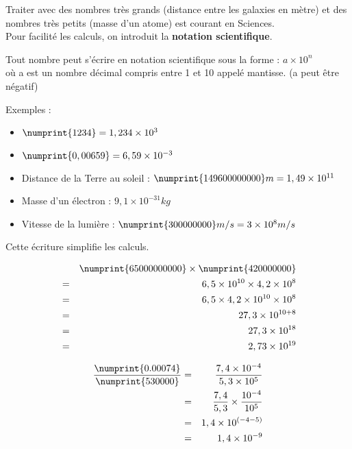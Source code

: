\documentclass[10pt]{article}
\begin{document}
Traiter avec des nombres très grands (distance entre les galaxies en mètre) et des nombres très petits (masse d'un atome) est courant en Sciences. \\
Pour facilité les calculs, on introduit la \textbf{notation scientifique}.

\begin{Definition}
  Tout nombre peut s'écrire en notation scientifique sous la forme : $ \boxed{ a \times 10^n} $\\
  où a est un nombre décimal compris entre 1 et 10 appelé mantisse. (a peut être négatif)
\end{Definition}

\begin{multicols}{3}

  Exemples :
  \begin{itemize}
  \item $\numprint{1 234} = 1,234 \times 10^3$
  \item $\numprint{0,006 59} = 6,59 \times 10^{-3}$
  \item Distance de la Terre au soleil :  $\numprint{149 600 000 000}m = 1,49 \times 10^{11}$
  \item Masse d'un électron : $9,1 \times 10^{-31}kg$
  \item Vitesse de la lumière : $\numprint{300 000 000}m/s = 3 \times 10 ^8 m/s$
  \end{itemize}

  Cette écriture simplifie les calculs.

  \begin{eqnarray*}
    & & \numprint{65 000 000 000} \times \numprint{420 000 000} \\
    &=& 6,5 \times 10 ^{10} \times 4,2 \times 10 ^{8} \\
    &=& 6,5 \times 4,2 \times 10^{10} \times 10^8 \\
    &=& 27,3 \times 10^{10 + 8}\\
    &=& 27,3 \times 10^{18} \\
    &=& 2,73 \times 10^{19}
  \end{eqnarray*}

  \begin{eqnarray*}
    \dfrac{\numprint{0. 000 74}}{\numprint{530 000}} &=& \dfrac{7,4 \times 10^{-4}}{5,3 \times 10^{5}} \\
    &=& \dfrac{7,4}{5,3} \times \dfrac{10^{-4}}{10^{5}} \\
    &=& 1,4 \times 10^{( -4 - 5 )} \\
    &=& 1,4 \times 10^{-9}
  \end{eqnarray*}

\end{multicols}
\end{document}
